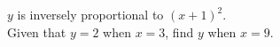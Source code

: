 \question
$y$ is inversely proportional to $(x+1)^2$.\\
Given that $y=2$ when $x=3$, find $y$ when $x=9$.\\ \vspace{200pt}
{}
